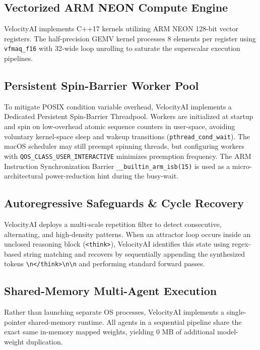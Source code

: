 \documentclass[a4paper,twocolumn,10pt]{article}
\begin{document}
\subsection{Vectorized ARM NEON Compute Engine}
VelocityAI implements C++17 kernels utilizing ARM NEON 128-bit vector registers. The half-precision GEMV kernel processes 8 elements per register using \texttt{vfmaq\_f16} with 32-wide loop unrolling to saturate the superscalar execution pipelines.

\subsection{Persistent Spin-Barrier Worker Pool}
To mitigate POSIX condition variable overhead, VelocityAI implements a Dedicated Persistent Spin-Barrier Threadpool. Workers are initialized at startup and spin on low-overhead atomic sequence counters in user-space, avoiding voluntary kernel-space sleep and wakeup transitions (\texttt{pthread\_cond\_wait}). The macOS scheduler may still preempt spinning threads, but configuring workers with \texttt{QOS\_CLASS\_USER\_INTERACTIVE} \cite{apple2014qos} minimizes preemption frequency. The ARM Instruction Synchronization Barrier \texttt{\_\_builtin\_arm\_isb(15)} \cite{arm2022architecture} is used as a micro-architectural power-reduction hint during the busy-wait.

\subsection{Autoregressive Safeguards \& Cycle Recovery}
VelocityAI deploys a multi-scale repetition filter to detect consecutive, alternating, and high-density patterns. When an attractor loop occurs inside an unclosed reasoning block (\texttt{<think>}), VelocityAI identifies this state using regex-based string matching and recovers by sequentially appending the synthesized tokens \texttt{\textbackslash n</think>\textbackslash n\textbackslash n} and performing standard forward passes.

\subsection{Shared-Memory Multi-Agent Execution}
Rather than launching separate OS processes, VelocityAI implements a single-pointer shared-memory runtime. All agents in a sequential pipeline share the exact same in-memory mapped weights, yielding 0 MB of additional model-weight duplication.
\end{document}
